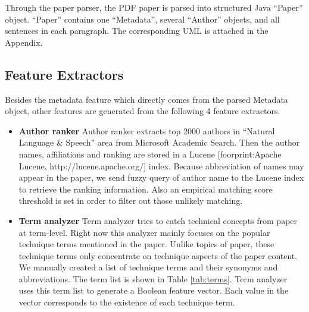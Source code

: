 \documentclass[11pt,letterpaper]{article}
\begin{document}
Through the paper parser, the PDF paper is parsed into structured Java ``Paper'' object. ``Paper'' contains one ``Metadata'', several ``Author'' objects, and all sentences in each paragraph. The corresponding UML is attached in the Appendix.


\subsection{Feature Extractors}
Besides the metadata feature which directly comes from the parsed Metadata object, other features are generated from the following 4 feature extractors. 

\begin{itemize} 
\item {\bf Author ranker}
Author ranker extracts top 2000 authors in ``Natural Language \& Speech'' area from Microsoft Academic Search. Then the author names, affiliations and ranking are stored in a Lucene [foorprint:Apache Lucene, http://lucene.apache.org/] index. Because abbreviation of names may appear in the paper, we send fuzzy query of author name to the Lucene index to retrieve the ranking information. Also an empirical matching score threshold is set in order to filter out those unlikely matching. 


\item {\bf Term analyzer}
Term analyzer tries to catch technical concepts from paper at term-level. Right now this analyzer mainly focuses on the popular technique terms mentioned in the paper. Unlike topics of paper, these technique terms only concentrate on technique aspects of the paper content. We manually created a list of technique terms and their synonyms and abbreviations. 
The term list is shown in Table \ref{tab:terms}.
Term analyzer uses this term list to generate a Boolean feature vector. Each value in the vector corresponds to the existence of each technique term.



\end{itemize}
\end{document}
